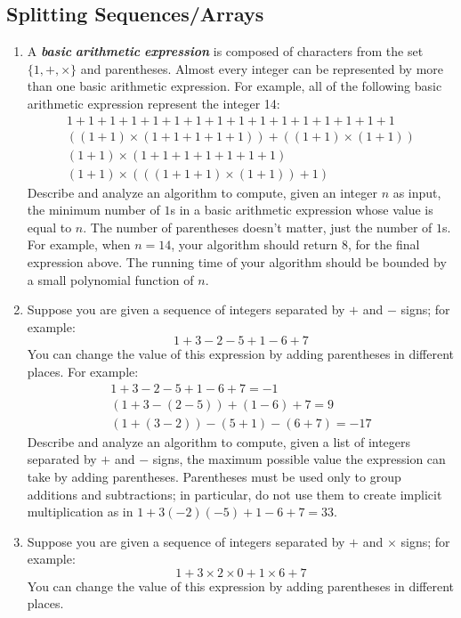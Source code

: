 \subsection*{Splitting Sequences/Arrays}
\begin{enumerate}[label=\arabic*.,ref=\thechapter.\arabic*,leftmargin=*,align=left,widest*=99,itemsep=1.5ex plus 0.5ex,resume]
\item A \textbf{\textit{basic}} \textbf{\textit{arithmetic}} \textbf{\textit{expression}} is composed of characters from the set $\{1,+,\times\}$ and parentheses.
Almost every integer can be represented by more than one basic arithmetic expression.
For example, all of the following basic arithmetic expression represent the integer 14:
\[
\begin{array}{c}
1+1+1+1+1+1+1+1+1+1+1+1+1+1+1+1\\
((1+1)\times (1+1+1+1+1)) + ((1+1)\times (1+1))\\
(1+1)\times (1+1+1+1+1+1+1)\\
(1+1)\times (((1+1+1)\times (1+1)) +1)
\end{array}
\]
Describe and analyze an algorithm to compute, given an integer $n$ as input, the minimum number of $1$s in a basic arithmetic expression whose value is equal to $n$.
The number of parentheses doesn’t matter, just the number of $1$s.
For example, when $n=14$, your algorithm should return $8$, for the final expression above.
The running time of your algorithm should be bounded by a small polynomial function of $n$.
\item Suppose you are given a sequence of integers separated by $+$ and $-$ signs; for example:
\[
1+3-2-5+1-6+7
\]
You can change the value of this expression by adding parentheses in different places.
For example:
\[
\begin{array}{c}
1+3-2-5+1-6+7=-1\\
(1+3-(2-5)) + (1-6) +7=9\\
(1+ (3-2))-(5+1)-(6+7) =-17
\end{array}
\]
Describe and analyze an algorithm to compute, given a list of integers separated by $+$ and $-$ signs, the maximum possible value the expression can take by adding parentheses.
Parentheses must be used only to group additions and subtractions; in particular, do not use them to create implicit multiplication as in $1+3(-2)(-5) +1-6+7=33$.
\item Suppose you are given a sequence of integers separated by $+$ and $\times$ signs; for example:
\[
1+3\times 2\times 0+1\times 6+7
\]
You can change the value of this expression by adding parentheses in different places.

\end{enumerate}

